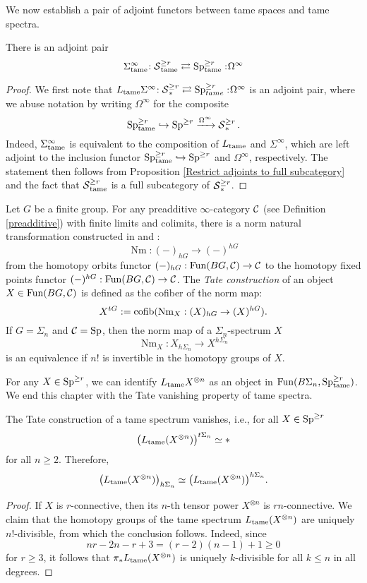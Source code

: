 We now establish a pair of adjoint functors between tame spaces and tame spectra.

\begin{proposition}
	There is an adjoint pair
	\[
	\Sigma^{\infty}_{\operatorname{\operatorname{tame}}}\negmedspace: \operatorname{\mathcal{S}}^{\geq r}_{\operatorname{\operatorname{tame}}}\rightleftarrows \operatorname{Sp}^{\geq r}_{\operatorname{\operatorname{tame}}}:\negmedspace \Omega^{\infty}
	\]
\end{proposition}
\begin{proof}
	We first note that $L_{\operatorname{\operatorname{tame}}}\Sigma^{\infty}\negmedspace: \operatorname{\mathcal{S}}_{*}^{\geq r}\rightleftarrows \operatorname{Sp}^{\geq r}_{tame}:\negmedspace \Omega^\infty$ is an adjoint pair, where we abuse notation by writing $\Omega^{\infty}$ for the composite  $$
	\operatorname{Sp}^{\geq r}_{\operatorname{\operatorname{tame}}}\hookrightarrow \operatorname{Sp}^{\geq r} \xrightarrow{\Omega^\infty} \operatorname{\mathcal{S}}^{\geq r}_{*}.
	$$ 
	Indeed, $\Sigma^{\infty}_{\operatorname{\operatorname{tame}}}$ is equivalent to the composition of $L_{\operatorname{\operatorname{tame}}}$ and $\Sigma^\infty$, which are left adjoint to the inclusion functor $\operatorname{Sp}^{\geq r}_{\operatorname{\operatorname{tame}}}\hookrightarrow \operatorname{Sp}^{\geq r}$ and $\Omega^\infty$, respectively. The statement then follows from Proposition \ref{Restrict adjoints to full subcategory} and the fact that $\operatorname{\mathcal{S}}_{\operatorname{\operatorname{tame}}}^{\geq r}$ is a full subcategory of $\operatorname{\mathcal{S}}_{*}^{\geq r}$. 
	
\end{proof}

Let $G$ be a finite group.
For any preadditive $\infty$-category ${\mathcal{C}}$ (see Definition \ref{preadditive}) with finite limits and colimits, there is a norm natural transformation constructed in \cite[\S 6.1.6]{HA} and \cite[Definition I.1.10]{Nikolaus-Scholze}:
$$
\operatorname{Nm}: (-)_{hG} \to (-)^{hG}
$$
from the homotopy orbits functor $(-)_{hG}:\operatorname{Fun}(BG,{\mathcal{C}})\to {\mathcal{C}}$ to the homotopy fixed points functor $(-)^{hG}:\operatorname{Fun}(BG,{\mathcal{C}})\to {\mathcal{C}}$.
The \emph{Tate construction} of an object $X\in \operatorname{Fun}(BG,{\mathcal{C}})$ is defined as the cofiber of the norm map:
$$
X^{tG} := \operatorname{cofib}(\operatorname{Nm}_X:(X)_{hG} \to (X)^{hG}).
$$
If $G=\Sigma_n$ and ${\mathcal{C}}=\operatorname{Sp}$, then the norm map of a $\Sigma_n$-spectrum $X$
$$
\operatorname{Nm}_X: X_{h\Sigma_n} \to X^{h\Sigma_n}
$$
is an equivalence if $n!$ is invertible in the homotopy groups of $X$.

For any $X\in \operatorname{Sp}^{\geq r}$, we can identify $L_{\operatorname{\operatorname{tame}}}X^{\otimes n}$ as an object in $\operatorname{Fun}(B\Sigma_n, \operatorname{Sp}^{\geq r}_{\operatorname{\operatorname{tame}}})$.
We end this chapter with the Tate vanishing property of tame spectra.
\begin{lemma}
\label{Tate vanishing for tame spectra}
    The Tate construction of a tame spectrum vanishes, i.e., for all $X\in \operatorname{Sp}^{\geq r}$
	$$
	\big(L_{\operatorname{\operatorname{tame}}}(X^{\otimes n})\big)^{t\Sigma_n}\simeq *
	$$
	for all $n\geq 2$. Therefore, 
	$$
	\big(L_{\operatorname{\operatorname{tame}}}(X^{\otimes n})\big)_{h\Sigma_n}
	\simeq
	\big(L_{\operatorname{\operatorname{tame}}}(X^{\otimes n})\big)^{h\Sigma_n}.
	$$
\end{lemma}
\begin{proof}
    If $X$ is $r$-connective, then its $n$-th tensor power $X^{\otimes n}$ is $rn$-connective. We claim that the homotopy groups of the tame spectrum $L_{\operatorname{\operatorname{tame}}}(X^{\otimes n})$ are uniquely $n!$-divisible, from which the conclusion follows. Indeed, since   
    $$
    nr-2n-r+3 = (r-2)(n-1)+1\geq 0
    $$
    for $r\geq 3$, it follows that $\pi_{*}L_{\operatorname{\operatorname{tame}}}(X^{\otimes n})$ is uniquely $k$-divisible for all $k\leq n$ in all degrees.
\end{proof}